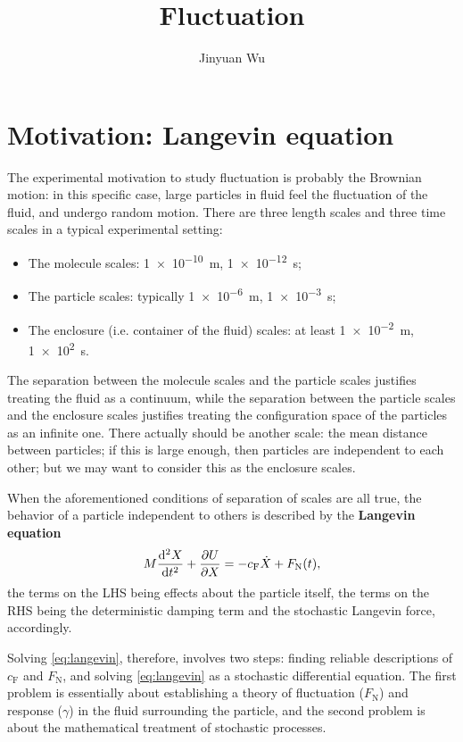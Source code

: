 \documentclass[hyperref, a4paper]{article}
\title{Fluctuation}
\author{Jinyuan Wu}
\newcommand*{\concept}[1]{{\textbf{#1}}}
\begin{document}
\maketitle

\section{Motivation: Langevin equation}

The experimental motivation to study fluctuation is 
probably the Brownian motion: 
in this specific case, 
large particles in fluid feel the fluctuation of the fluid,
and undergo random motion.
There are three length scales and three time scales 
in a typical experimental setting:
\begin{itemize}
    \item The molecule scales: \SI{1e-10}{m}, \SI{1e-12}{s};
    \item The particle scales: typically \SI{1e-6}{m}, \SI{1e-3}{s};
    \item The enclosure (i.e. container of the fluid) scales: 
    at least \SI{1e-2}{m}, \SI{1e2}{s}.
\end{itemize}
The separation between the molecule scales and the particle scales 
justifies treating the fluid as a continuum,
while the separation between the particle scales 
and the enclosure scales 
justifies treating the configuration space of the particles 
as an infinite one.
There actually should be another scale: 
the mean distance between particles;
if this is large enough, 
then particles are independent to each other; 
but we may want to consider this as the enclosure scales.

When the aforementioned conditions of separation of scales are all true, 
the behavior of a particle independent to others is described 
by the \concept{Langevin equation} 
\begin{equation}
    M \dv[2]{X}{t} + \pdv{U}{X} = - c_{\text{F}} \dot{X} + F_{\text{N}}(t),
    \label{eq:langevin}
\end{equation}
the terms on the LHS being effects about the particle itself,
the terms on the RHS being the deterministic damping term 
and the stochastic Langevin force, accordingly.

Solving \eqref{eq:langevin}, therefore, involves two steps:
finding reliable descriptions of $c_{\text{F}}$ and $F_{\text{N}}$,
and solving \eqref{eq:langevin} as a stochastic differential equation.
The first problem is essentially about establishing a theory 
of fluctuation ($F_{\text{N}}$) and response ($\gamma$) 
in the fluid surrounding the particle,
and the second problem is about the mathematical treatment 
of stochastic processes.
\end{document}
